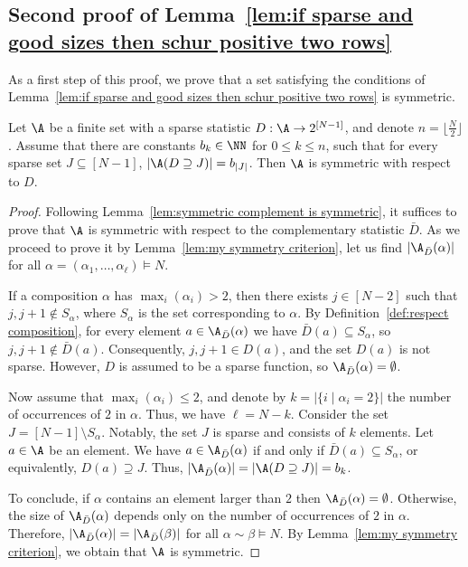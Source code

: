 \subsection{Second proof of Lemma~\ref{lem:if sparse and good sizes then schur positive two rows}}
\label{subsec:proof if sparse and good sizes then schur positive two rows by superstandard}
As a first step of this proof, we prove that a set satisfying the conditions of Lemma~\ref{lem:if sparse and good sizes then schur positive two rows} is symmetric.
\begin{lemma}
\label{lem:sufficent condition symmetry two rows}
    Let $\A$ be a finite set with a sparse statistic $D:\A \to 2^{[N-1]}$, and denote $n = \lfloor\frac{N}{2} \rfloor$. Assume that there are constants $b_k \in \NN$ for $0 \le k \le n$, such that for every sparse set $J \subseteq [N-1]$, $|\A(D \supseteq J)| = b_{|J|}$.
    Then $\A$ is symmetric with respect to $D$.
\end{lemma}
\begin{proof}
    Following Lemma~\ref{lem:symmetric complement is symmetric}, it suffices to prove that $\A$ is symmetric with respect to the complementary statistic $\bar{D}$. As we proceed to prove it by Lemma~\ref{lem:my symmetry criterion}, let us find $|\A_{\bar{D}}(\alpha)|$ for all $\alpha = (\alpha_1, \dots, \alpha_\ell) \vDash N$.
    
    If a composition $\alpha$ has $\max_i (\alpha_i) > 2$, 
    then there exists $j \in [N-2]$ such that $j,j+1 \notin S_\alpha$, where $S_\alpha$ is the set corresponding to $\alpha$. By Definition~\ref{def:respect composition}, for every element $a \in \A_{\bar{D}}(\alpha)$ we have $\bar{D}(a) \subseteq S_\alpha$, so $j, j + 1 \notin \bar{D}(a)$. Consequently, $j,j+1 \in D(a)$, and the set $D(a)$ is not sparse. However,
    $D$ is assumed to be a sparse function, so $\A_{\bar{D}}(\alpha) = \emptyset$.
    
    Now assume that $\max_i (\alpha_i) \le 2$, and denote by $k = |\{i \mid \alpha_i = 2\}|$ the number of occurrences of $2$ in $\alpha$. Thus, we have $\ell = N - k$.
    Consider the set $J = [N-1] \setminus S_\alpha$. Notably, the set $J$ is sparse and consists of $k$ elements.
    Let $a \in \A$ be an element. We have $a \in \A_{\bar{D}}(\alpha)$ if and only if $\bar{D}(a) \subseteq S_\alpha$, or equivalently, $D(a) \supseteq J$. Thus, $|\A_{\bar{D}}(\alpha)| = |\A(D \supseteq J)| = b_k$.
    
    To conclude, if $\alpha$ contains an element larger than $2$ then $\A_{\bar{D}}(\alpha) = \emptyset$. Otherwise, the size of $\A_{\bar{D}}(\alpha)$ depends only on the number of occurrences of $2$ in $\alpha$. Therefore, $|\A_{\bar{D}}(\alpha)| = |\A_{\bar{D}}(\beta)|$ for all $\alpha \sim \beta \vDash N$. By Lemma~\ref{lem:my symmetry criterion}, we obtain that $\A$ is symmetric.
\end{proof}

